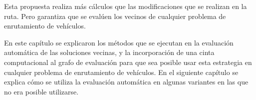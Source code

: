 Esta propuesta realiza más cálculos que las modificaciones que se realizan en la ruta. Pero garantiza que se evalúen los vecinos de cualquier problema de enrutamiento de vehículos. 

En este capítulo se explicaron los métodos que se ejecutan en la evaluación automática de las soluciones vecinas, y la incorporación de una cinta computacional al grafo de evaluación para que sea posible usar esta estrategia en cualquier problema de enrutamiento de vehículos. En el siguiente capítulo se explica cómo se utiliza la evaluación automática en algunas variantes en las que no era posible utilizarse.





























